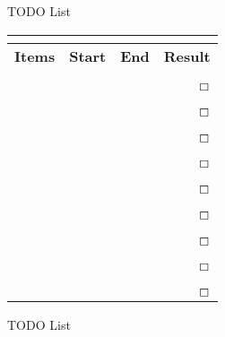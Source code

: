 \documentclass[12pt, a4paper]{article}
\begin{document}
\begin{autofilo}{}

TODO List \bigskip

\begin{table}[ht!]
\centering
\begin{tabular}{lllr}
{\bf \phantom{xxxxxxx}}&{\bf \phantom{xxxxxx}}%
&{\bf \phantom{xxxxxx}}&{\bf \phantom{xxxx}}\\
\hline
\hline
{\bf Items}&{\bf Start}&{\bf End}&{\bf Result}\\ \hline
{$\;$}\\
{$\;$}\\
{$\;$}&{$\;$}&{$\;$}&{\bf $\boxempty$}\\ \hline
{$\;$}\\
{$\;$}\\
{$\;$}&{$\;$}&{$\;$}&{\bf $\boxempty$}\\ \hline
{$\;$}\\
{$\;$}\\
{$\;$}&{$\;$}&{$\;$}&{\bf $\boxempty$}\\ \hline
{$\;$}\\
{$\;$}\\
{$\;$}&{$\;$}&{$\;$}&{\bf $\boxempty$}\\ \hline
{$\;$}\\
{$\;$}\\
{$\;$}&{$\;$}&{$\;$}&{\bf $\boxempty$}\\ \hline
{$\;$}\\
{$\;$}\\
{$\;$}&{$\;$}&{$\;$}&{\bf $\boxempty$}\\ \hline
{$\;$}\\
{$\;$}\\
{$\;$}&{$\;$}&{$\;$}&{\bf $\boxempty$}\\ \hline
{$\;$}\\
{$\;$}\\
{$\;$}&{$\;$}&{$\;$}&{\bf $\boxempty$}\\ \hline
{$\;$}\\
{$\;$}\\
{$\;$}&{$\;$}&{$\;$}&{\bf $\boxempty$}\\ \hline
\hline
\end{tabular}
\end{table}

\bigskip

TODO List

\bigskip


\end{autofilo}
\end{document}
